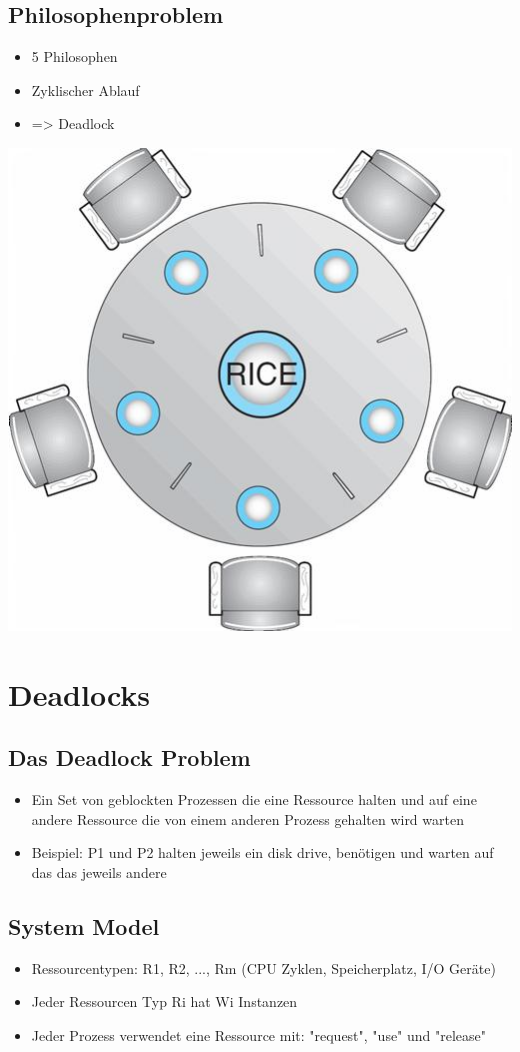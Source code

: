 \documentclass[a4paper]{scrreprt}
\begin{document}
		\subsection{Philosophenproblem}
			\begin{itemize}
				\item 5 Philosophen
				\item Zyklischer Ablauf
				\item => Deadlock
			\end{itemize}
			\includegraphics[scale=0.35] {philprob.png}
	\section{Deadlocks}
		\subsection{Das Deadlock Problem}
			\begin{itemize}
				\item Ein Set von geblockten Prozessen die eine Ressource halten und auf eine andere Ressource die von einem anderen Prozess gehalten wird warten
				\item Beispiel: P1 und P2 halten jeweils ein disk drive, benötigen und warten auf das das jeweils andere
			\end{itemize}
		\subsection{System Model}
			\begin{itemize}
				\item Ressourcentypen: R1, R2, ..., Rm (CPU Zyklen, Speicherplatz, I/O Geräte)
				\item Jeder Ressourcen Typ Ri hat Wi Instanzen
				\item Jeder Prozess verwendet eine Ressource mit: "request", "use" und "release"
			\end{itemize}
\end{document}
